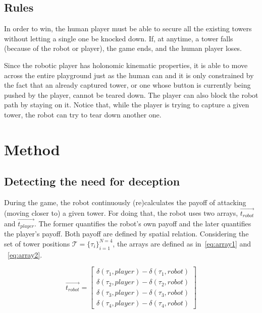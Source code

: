 \subsection{Rules}
In order to win, the human player must be able to secure all the existing towers without letting a single one be knocked down. If, at anytime, a tower falls (because of the robot or player), the game ends, and the human player loses. 

Since the robotic player has holonomic kinematic properties, it is able to move across the entire playground just as the human can and it is only constrained by the fact that an already captured tower, or one whose button is currently being pushed by the player, cannot be teared down. The player can also block the robot path by staying on it. Notice that, while the player is trying to capture a given tower, the robot can try to tear down another one. 

\section{Method}
\label{S:Method}

\subsection{Detecting the need for deception}

During the game, the robot continuously (re)calculates the payoff of attacking (moving closer to) a given tower. For doing that, the robot uses two arrays, $\overrightarrow{t_{robot}}$ and $\overrightarrow{t_{player}}$. The former quantifies the robot's own payoff and the later quantifies the player's payoff. Both payoff are defined by spatial relation. Considering the set of tower positions $\mathcal{T} = \{\tau_{i}\}_{i=1}^{N=4}$, the arrays are defined as in~\ref{eq:array1} and ~\ref{eq:array2}.

\begin{equation}
\overrightarrow{t_{robot}} = \begin{bmatrix}
\delta(\tau_{1},player) -\delta(\tau_{1},robot)  \\ 
\delta(\tau_{2},player) - \delta(\tau_{2},robot)  \\
\delta(\tau_{3},player) - \delta(\tau_{3},robot) \\
\delta(\tau_{4},player) - \delta(\tau_{4},robot)
\end{bmatrix}
\label{eq:array1}
\end{equation}


